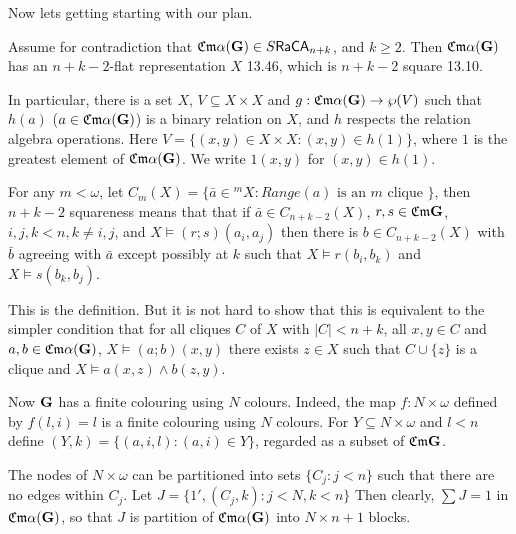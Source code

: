 \documentclass[12pt]{article}
\theoremstyle{definition}
\def\Nr{{\mathfrak{Nr}}}
\def\A{{\mathfrak{A}}}
\def\M{{\mathfrak{M}}}
\def\CA{{\sf CA}}
\def\CA{{\sf CA}}
\def\G{{\sf G}}
\def\Cm{{\mathfrak{Cm}}}
\def\Nr{{\mathfrak{Nr}}}
\def\Ra{{\mathfrak{Ra}}}
\def\Ra{{\mathfrak{Ra}}}
\def\Nr{{\mathfrak{Nr}}}
\def\A{{\mathfrak{A}}}
\def\A{{\mathfrak{A}}}
\def\CA{{\sf CA}}
\def\G{{\bf G}}
\def\Ra{{\sf Ra}}
\begin{document}


Now lets getting starting with our plan.

Assume for contradiction that $\Cm\alpha(\G)\in S\Ra \CA_{n+k}$, and $k\geq 2$. 
Then $\Cm\alpha(\G)$ has an $n+k-2$-flat representation $X$ \cite{HHbook2}  13.46, 
which is $n+k-2$ square \cite{HHbook2} 13.10. 

In particular, there is a set $X$, $V\subseteq X\times X$ and $g: \Cm\alpha(\G)\to \wp(V)$ 
such that $h(a)$ ($a\in \Cm\alpha(\G)$) is a binary relation on $X$, and
$h$ respects the relation algebra operations. Here $V=\{(x,y)\in X\times X: (x,y)\in h(1)\}$, where $1$ is the greatest element of 
$\Cm\alpha(\G)$. We write $1(x,y)$ for $(x,y)\in h(1).$ 

For any $m<\omega$, let $C_m(X)=\{\bar{a}\in {}^mX: Range(a)\text { is an $m$ clique }\}$, then $n+k-2$ squareness
means that that if $\bar{a}\in C_{n+k-2}(X)$, $r,s\in \Cm\G$, $i,j,k<n, k\neq i,j$, and $X\models (r;s)(a_i, a_j)$ then there is $b\in C_{n+k-2}(X)$ 
with $\bar{b}$ agreeing with $\bar{a}$ except possibly at $k$
such that $X\models r(b_i, b_k)$ and $X\models s(b_k, b_j)$. 

This is the definition. But it is not hard to show that this is equivalent to
 the simpler condition that 
for all cliques $C$ of $X$ with $|C|<n+k$, all $x,y\in C$ 
and $a,b\in \Cm\alpha(\G)$, $X\models (a;b)(x,y)$ 
there exists $z\in X$ such that $C\cup \{z\}$ is a clique and $X\models a(x,z)\land b(z,y)$.

Now $\G$ has a finite colouring using $N$ colours. Indeed, the map $f:N\times \omega$ defined by $f(l,i)=l$ 
is a finite colouring using $N$ colours. For $Y\subseteq N\times \omega$ and $l<n$ define
$(Y, k)=\{(a,i,l): (a,i)\in Y\}$, regarded as a subset of $\Cm\G$. 

The nodes of $N\times \omega$ can be partitioned into
sets $\{C_j: j<n\}$ such that there are no edges within $C_j$.
Let $J=\{1', (C_j,k): j<N, k<n\}$ 
Then clearly, $\sum J=1$ in $\Cm\alpha(\G)$,  so that $J$ is partition of $\Cm\alpha(\G)$ into $N\times n+1$ blocks.
\end{document}
